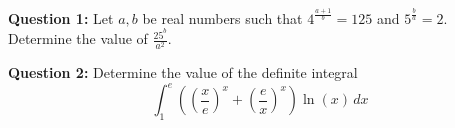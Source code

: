 \documentclass{article}
\begin{document}
	
	\textbf{Question 1:}
	Let \( a, b \) be real numbers such that \( 4^{\frac{a+1}{b}} = 125 \) and \( 5^{\frac{b}{a}} = 2 \). Determine the value of \( \frac{25^b}{a^2} \).
	
	\textbf{Question 2:}
	Determine the value of the definite integral
	\[ \int_{1}^{e} \left( \left(\frac{x}{e}\right)^x + \left(\frac{e}{x}\right)^x \right) \ln(x) \, dx \]
	
\end{document}
